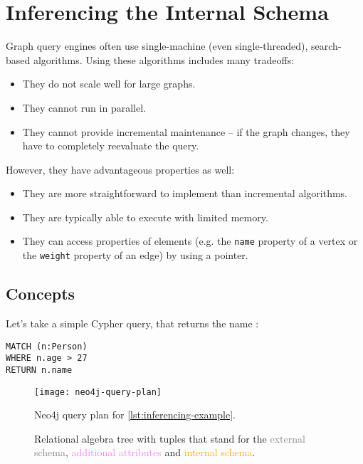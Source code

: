 \chapter{Inferencing the Internal Schema}

Graph query engines often use single-machine (even single-threaded), search-based algorithms. Using these algorithms includes many tradeoffs:

\begin{itemize}
	\item They do not scale well for large graphs.
	\item They cannot run in parallel.
	\item They cannot provide incremental maintenance -- if the graph changes, they have to completely reevaluate the query.
\end{itemize}

However, they have advantageous properties as well:

\begin{itemize}
	\item They are more straightforward to implement than incremental algorithms.
	\item They are typically able to execute with limited memory.
	\item They can access properties of elements (e.g. the \texttt{name} property of a vertex or the \texttt{weight} property of an edge) by using a pointer.
\end{itemize}

\section{Concepts}

Let's take a simple Cypher query, that returns the name :

\begin{lstlisting}[label=lst:inferencing-example, caption=Example query]
MATCH (n:Person)
WHERE n.age > 27
RETURN n.name
\end{lstlisting}

\newcommand{\screenshotscale}{0.45}

\begin{figure}
	\centering
	\texttt{[image: neo4j-query-plan]}
	\caption{Neo4j query plan for \autoref{lst:inferencing-example}.}
	\label{fig:neo4-query-plan}
\end{figure}

\begin{figure}
	\centering
	
	\caption{Relational algebra tree with tuples that stand for the \textcolor{gray}{external schema}, \textcolor{violet}{additional attributes} and \textcolor{orange}{internal schema}.}
	\label{fig:example-inferencing}
\end{figure}

